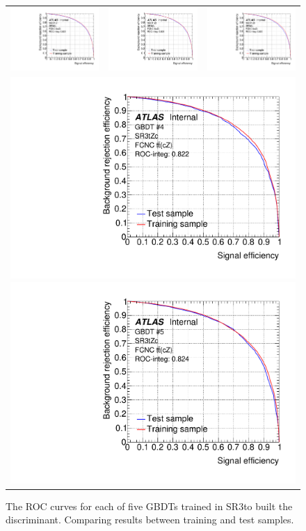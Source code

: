 \begin{figure}[htbp]
	\centering
	\begin{tabular}{ccc}
		\includegraphics[width=.3\textwidth]{Chapters/CH5/figures/SR3_UsingSMT/BDT/ROC_Fold1} &
		\includegraphics[width=.3\textwidth]{Chapters/CH5/figures/SR3_UsingSMT/BDT/ROC_Fold2} &
		\includegraphics[width=.3\textwidth]{Chapters/CH5/figures/SR3_UsingSMT/BDT/ROC_Fold3} \\ 
		\multicolumn{3}{c}{
			\includegraphics[width=.3\textwidth]{Chapters/CH5/figures/SR3_UsingSMT/BDT/ROC_Fold4}
			\includegraphics[width=.3\textwidth]{Chapters/CH5/figures/SR3_UsingSMT/BDT/ROC_Fold5}} \\
	\end{tabular}
	\caption{ The ROC curves for each of five GBDTs trained in SR3\tZc to built the \Dthree discriminant. 
		Comparing results between training and test samples.
	}%
	\label{fig:separation:SR3:ROC}
\end{figure}

